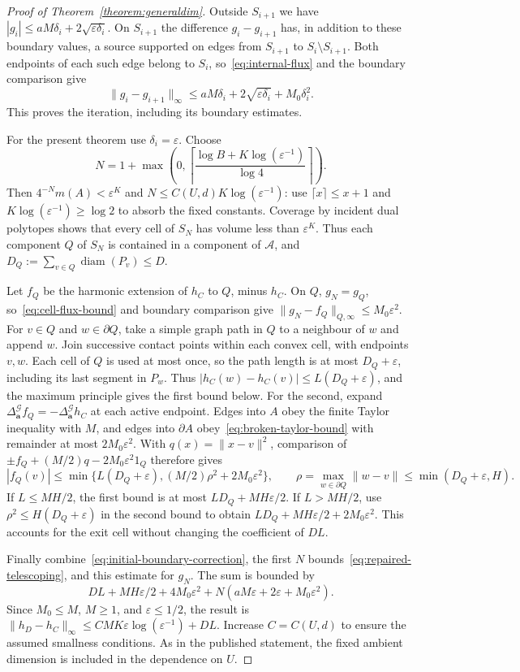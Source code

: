 \documentclass[12pt]{amsart}
\numberwithin{equation}{section}
\DeclareMathOperator{\diam}{{\mathop{diam}}}
\newcommand{\eps}{\varepsilon}
\newcommand{\aDelta}{\hyperref[eq:geometric-laplacian]{{\Delta^{\mathcal{G}}_{\cond}}}}
\newcommand{\cond}{\hyperref[eq:geometric-laplacian]{\mathbf{a}}}
\begin{document}
\begin{proof}[Proof of Theorem~\ref{theorem:generaldim}]
Outside $S_{i+1}$ we have $|g_i|\leq aM\delta_i+2\sqrt{\eps\delta_i}$. On $S_{i+1}$ the difference $g_i-g_{i+1}$ has, in addition to these boundary values, a source supported on edges from $S_{i+1}$ to $S_i\setminus S_{i+1}$. Both endpoints of each such edge belong to $S_i$, so~\eqref{eq:internal-flux} and the boundary comparison give
\begin{equation}\label{eq:repaired-telescoping}
 \|g_i-g_{i+1}\|_\infty
 \leq aM\delta_i+2\sqrt{\eps\delta_i}+M_0\delta_i^2.
\end{equation}
This proves the iteration, including its boundary estimates.

For the present theorem use $\delta_i=\eps$. Choose
\[
 N=1+\max\left(0,\left\lceil\frac{\log B+K\log(\eps^{-1})}{\log4}\right\rceil\right).
\]
Then $4^{-N}m(A)<\eps^K$ and $N\le C(U,d)K\log(\eps^{-1})$: use $\lceil x\rceil\le x+1$ and $K\log(\eps^{-1})\ge\log2$ to absorb the fixed constants. Coverage by incident dual polytopes shows that every cell of $S_N$ has volume less than $\eps^K$. Thus each component $Q$ of $S_N$ is contained in a component of $\mathcal A$, and $D_Q:=\sum_{v\in Q}\diam(P_v)\le D$.

Let $f_Q$ be the harmonic extension of $h_C$ to $Q$, minus $h_C$. On $Q$, $g_N=g_Q$, so~\eqref{eq:cell-flux-bound} and boundary comparison give $\|g_N-f_Q\|_{Q,\infty}\le M_0\eps^2$.
For $v\in Q$ and $w\in\partial Q$, take a simple graph path in $Q$ to a neighbour of $w$ and append $w$. Join successive contact points within each convex cell, with endpoints $v,w$. Each cell of $Q$ is used at most once, so the path length is at most $D_Q+\eps$, including its last segment in $P_w$. Thus $|h_C(w)-h_C(v)|\le L(D_Q+\eps)$, and the maximum principle gives the first bound below.
For the second, expand $\aDelta f_Q=-\aDelta h_C$ at each active endpoint. Edges into $A$ obey the finite Taylor inequality with $M$, and edges into $\partial A$ obey~\eqref{eq:broken-taylor-bound} with remainder at most $2M_0\eps^2$. With $q(x)=\|x-v\|^2$, comparison of $\pm f_Q+(M/2)q-2M_0\eps^2 1_Q$ therefore gives
\[
 |f_Q(v)|\leq\min\{L(D_Q+\eps),(M/2)\rho^2+2M_0\eps^2\},
 \qquad \rho=\max_{w\in\partial Q}\|w-v\|\leq\min(D_Q+\eps,H).
\]
If $L\le MH/2$, the first bound is at most $LD_Q+MH\eps/2$. If $L>MH/2$, use $\rho^2\le H(D_Q+\eps)$ in the second bound to obtain $LD_Q+MH\eps/2+2M_0\eps^2$. This accounts for the exit cell without changing the coefficient of $DL$.

Finally combine~\eqref{eq:initial-boundary-correction}, the first $N$ bounds~\eqref{eq:repaired-telescoping}, and this estimate for $g_N$. The sum is bounded by
\[
 DL+MH\eps/2+4M_0\eps^2+N(aM\eps+2\eps+M_0\eps^2).
\]
Since $M_0\le M$, $M\ge1$, and $\eps\le1/2$, the result is
$\|h_D-h_C\|_\infty\leq CMK\eps\log(\eps^{-1})+DL$.
Increase $C=C(U,d)$ to ensure the assumed smallness conditions. As in the published statement, the fixed ambient dimension is included in the dependence on $U$.
\end{proof}
\end{document}
